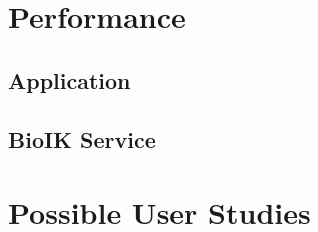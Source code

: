 \section{Performance}

\subsection{Application}

\subsection{BioIK Service}
\label{sec:eval:ikservice}

\section{Possible User Studies}